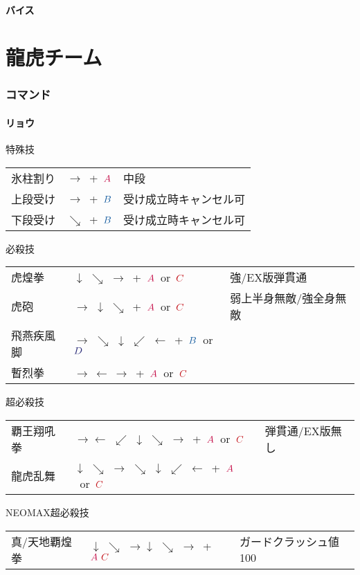 \documentclass[a4j,11pt]{jarticle}
\def\A{\textcolor{Acolor}{A}}
\def\C{\textcolor{Ccolor}{C}}
\def\B{\textcolor{Bcolor}{B}}
\def\D{\textcolor{Dcolor}{D}}
\def\hado{$\downarrow$ $\searrow$ $\rightarrow$}%
\def\syoryu{$\rightarrow$ $\downarrow$ $\searrow$}%
\def\yoga{$\leftarrow$ $\swarrow$ $\downarrow$ $\searrow$ $\rightarrow$}%
\def\gyakuyoga{$\rightarrow$ $\searrow$ $\downarrow$ $\swarrow$ $\leftarrow$}%
\def\ryuko{$\downarrow$ $\searrow$ $\rightarrow$ $\searrow$ $\downarrow$ $\swarrow$ $\leftarrow$}%
\begin{document}
\subsection{バイス}
\newpage
\part{龍虎チーム}%
\section{コマンド}
\subsection{リョウ}
\begin{itembox}[l]{特殊技}
\begin{tabular}{lll}
氷柱割り&$\rightarrow$\ +\ $\A$&中段\\%
上段受け&$\rightarrow$\ +\ $\B$&受け成立時キャンセル可\\%
下段受け&$\searrow$\ +\ $\B$&受け成立時キャンセル可%
\end{tabular}
\end{itembox}
\begin{itembox}[l]{必殺技}
\begin{tabular}{lll}
虎煌拳&\hado\ +\ $\A$\ or\ $\C$&強/EX版弾貫通\\%
虎砲&\syoryu\ +\ $\A$\ or\ $\C$&弱上半身無敵/強全身無敵\\%
飛燕疾風脚&\gyakuyoga\ +\ $\B$\ or\ $\D$&\\%
暫烈拳&$\rightarrow\ \leftarrow\ \rightarrow$\ +\ $\A$\ or\ $\C$&%
\end{tabular}
\end{itembox}
\begin{itembox}[l]{超必殺技}
\begin{tabular}{lll}
覇王翔吼拳&$\rightarrow$\yoga\ +\ $\A$\ or\ $\C$&弾貫通/EX版無し\\%
龍虎乱舞&\ryuko\ +\ $\A$\ or\ $\C$&%
\end{tabular}
\end{itembox}
\begin{itembox}[l]{NEOMAX超必殺技}
\begin{tabular}{lll}
真/天地覇煌拳&\hado\hado\ +\ $\A\ \C$&ガードクラッシュ値100%
\end{tabular}
\end{itembox}
\newpage
\end{document}

